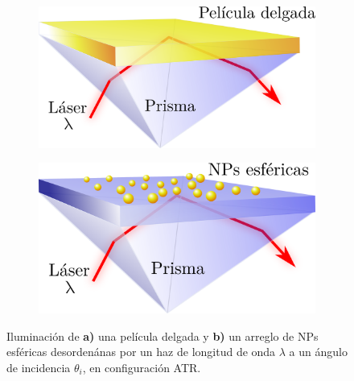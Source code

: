 	\begin{figure}[h!]\centering
	\begin{subfigure}{.05\textwidth}\vspace{-3.5cm}\caption{}\label{sfig:Pols}\end{subfigure}
	\begin{subfigure}{.43\textwidth} 
		\includegraphics[scale=.225]{0-4-Introduccion/figs/SPP-3D.png}
		\end{subfigure}
	\begin{subfigure}{.05\textwidth}\vspace{-3.5cm}\caption{}\label{sfig:Polp}	\end{subfigure}
	\begin{subfigure}{.43\textwidth}  
		\includegraphics[scale=.225]{0-4-Introduccion/figs/NPs-3D.png}
	\end{subfigure} 
	\caption{ Iluminación de \textbf{a)} una película delgada y \textbf{b)} un arreglo de NPs esf\'ericas desordenánas por un haz de longitud de onda $\lambda$ a un \'angulo de incidencia $\theta_i$, en configuraci\'on ATR.}	\label{fig:ATR1}	
	\end{figure}	
	
